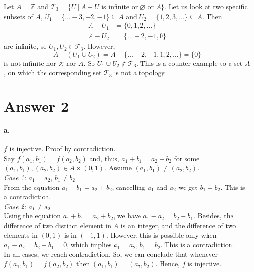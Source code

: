 \documentclass[11pt]{article}
\begin{document}
Let $A = \mathbb{Z}$ and $\mathcal{T}_3 = \{U \ | \ A - U$ is infinite or $\varnothing$ or $A\}$. Let us look at two specific subsets of $A$, $U_1 = \{ \dots -3, -2, -1\} \subseteq A$ and $U_2 = \{1, 2, 3, \dots \} \subseteq A$. Then \\
\begin{align*}
    A - U_1 &= \{0, 1, 2, \dots\} \\
    A - U_2 &= \{\dots -2, -1, 0\}
\end{align*}
are infinite, so $U_1, U_2 \in \mathcal{T}_3$. However,
\[
    A - (U_1 \cup U_2) = A - \{\dots -2, -1, 1, 2, \dots\} = \{0\}
\]
is not infinite nor $\varnothing$ nor $A$. So $U_1 \cup U_2 \notin \mathcal{T}_3$. This is a counter example to a set $A$, on which the corresponding set $\mathcal{T}_3$ is not a topology.

\newpage
\section*{Answer 2}
\paragraph{a.} $f$ is injective. Proof by contradiction. \\

Say $f(a_1, b_1) = f(a_2, b_2)$ and, thus, $a_1 + b_1 = a_2 + b_2$ for some $(a_1, b_1), (a_2, b_2) \in A \times (0, 1)$. Assume $(a_1, b_1) \neq (a_2, b_2)$. \\

\noindent \textit{Case 1:} $a_1 = a_2$, $b_1 \neq b_2$ \\
From the equation $a_1 + b_1 = a_2 + b_2$, cancelling $a_1$ and $a_2$ we get $b_1 = b_2$. This is a contradiction. \\

\noindent \textit{Case 2:} $a_1 \neq a_2$ \\
Using the equation $a_1 + b_1 = a_2 + b_2$, we have $a_1 - a_2 = b_2 - b_1$. Besides, the difference of two distinct element in $A$ is an integer, and the difference of two elements in $(0, 1)$ is in $(-1, 1)$. However, this is possible only when $a_1 - a_2 = b_2 - b_1 = 0$, which implies $a_1 = a_2$, $b_1 = b_2$. This is a contradiction. \\

\noindent In all cases, we reach contradiction. So, we can conclude that whenever $f(a_1, b_1) = f(a_2, b_2)$ then $(a_1, b_1) = (a_2, b_2)$. Hence, $f$ is injective. \\
\end{document}
